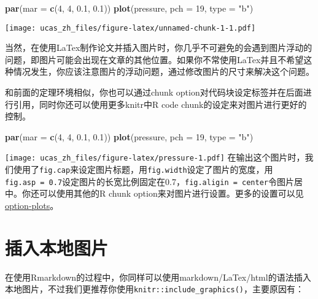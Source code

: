 \documentclass[singlesided]{Style/ucasthesis}%
\newenvironment{Shaded}{\begin{snugshade}}{\end{snugshade}}
\newcommand{\KeywordTok}[1]{\textcolor[rgb]{0.13,0.29,0.53}{\textbf{{#1}}}}
\newcommand{\DataTypeTok}[1]{\textcolor[rgb]{0.13,0.29,0.53}{{#1}}}
\newcommand{\DecValTok}[1]{\textcolor[rgb]{0.00,0.00,0.81}{{#1}}}
\newcommand{\FloatTok}[1]{\textcolor[rgb]{0.00,0.00,0.81}{{#1}}}
\newcommand{\StringTok}[1]{\textcolor[rgb]{0.31,0.60,0.02}{{#1}}}
\newcommand{\NormalTok}[1]{{#1}}
\begin{document}
\begin{Shaded}
\begin{Highlighting}[]
\KeywordTok{par}\NormalTok{(}\DataTypeTok{mar =} \KeywordTok{c}\NormalTok{(}\DecValTok{4}\NormalTok{, }\DecValTok{4}\NormalTok{, }\FloatTok{0.1}\NormalTok{, }\FloatTok{0.1}\NormalTok{))}
\KeywordTok{plot}\NormalTok{(pressure, }\DataTypeTok{pch =} \DecValTok{19}\NormalTok{, }\DataTypeTok{type =} \StringTok{"b"}\NormalTok{)}
\end{Highlighting}
\end{Shaded}

\texttt{[image: ucas\_zh\_files/figure-latex/unnamed-chunk-1-1.pdf]}

当然，在使用LaTex制作论文并插入图片时，你几乎不可避免的会遇到图片浮动的问题，即图片可能会出现在文章的其他位置。如果你不常使用LaTex并且不希望这种情况发生，你应该注意图片的浮动问题，通过修改图片的尺寸来解决这个问题。

和前面的定理环境相似，你也可以通过chunk option对代码块设定标签并在后面进行引用，同时你还可以使用更多knitr中R code chunk的设定来对图片进行更好的控制。

\begin{Shaded}
\begin{Highlighting}[]
\KeywordTok{par}\NormalTok{(}\DataTypeTok{mar =} \KeywordTok{c}\NormalTok{(}\DecValTok{4}\NormalTok{, }\DecValTok{4}\NormalTok{, }\FloatTok{0.1}\NormalTok{, }\FloatTok{0.1}\NormalTok{))}
\KeywordTok{plot}\NormalTok{(pressure, }\DataTypeTok{pch =} \DecValTok{19}\NormalTok{, }\DataTypeTok{type =} \StringTok{"b"}\NormalTok{)}
\end{Highlighting}
\end{Shaded}

\texttt{[image: ucas\_zh\_files/figure-latex/pressure-1.pdf]}
在输出这个图片时，我们使用了\texttt{fig.cap}来设定图片标题，用\texttt{fig.width}设定了图片的宽度，用\texttt{fig.asp\ =\ 0.7}设定图片的长宽比例固定在0.7，\texttt{fig.aligin\ =\ \textquotesingle{}center\textquotesingle{}}令图片居中。你还可以使用其他的R chunk option来对图片进行设置。更多的设置可以见\href{https://yihui.name/knitr/options/\#plots}{option-plots}。

\hypertarget{section-4}{%
\section{插入本地图片}\label{section-4}}

在使用Rmarkdown的过程中，你同样可以使用markdown/LaTex/html的语法插入本地图片，不过我们更推荐你使用\texttt{knitr::include\_graphics()}，主要原因有：
\end{document}
